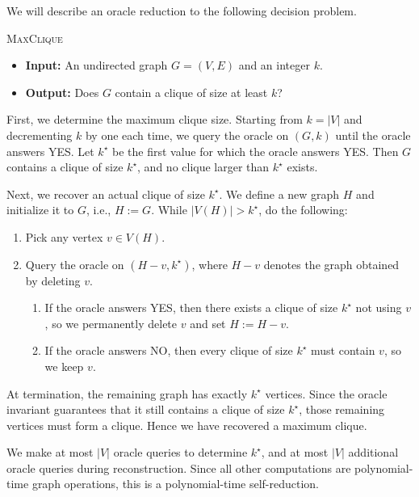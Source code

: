 \documentclass[12pt]{article}
\begin{document}
\begin{solution}
\bbni

    \item
    We will describe an oracle reduction to the following decision problem.

    \begin{tcolorbox}
        \textsc{MaxClique}
        \begin{itemize}
            \item \textbf{Input:} An undirected graph $G=(V,E)$ and an integer $k$.
            \item \textbf{Output:} Does $G$ contain a clique of size at least $k$?
        \end{itemize}
    \end{tcolorbox}

    First, we determine the maximum clique size. Starting from $k = |V|$ and decrementing $k$ by one each time, we query the oracle on $(G,k)$ until the oracle answers YES. Let $k^\star$ be the first value for which the oracle answers YES. Then $G$ contains a clique of size $k^\star$, and no clique larger than $k^\star$ exists.

    Next, we recover an actual clique of size $k^\star$. We define a new graph $H$ and initialize it to $G$, i.e., $H := G$. While $|V(H)| > k^\star$, do the following:

    \begin{enumerate}
        \item Pick any vertex $v \in V(H)$.
        \item Query the oracle on $(H-v, k^\star)$, where $H-v$ denotes the graph obtained by deleting $v$.
        \begin{enumerate}
            \item If the oracle answers YES, then there exists a clique of size $k^\star$ not using $v$, so we permanently delete $v$ and set $H := H-v$.
            \item If the oracle answers NO, then every clique of size $k^\star$ must contain $v$, so we keep $v$.
        \end{enumerate}
    \end{enumerate}

    At termination, the remaining graph has exactly $k^\star$ vertices. Since the oracle invariant guarantees that it still contains a clique of size $k^\star$, those remaining vertices must form a clique. Hence we have recovered a maximum clique.

    We make at most $|V|$ oracle queries to determine $k^\star$, and at most $|V|$ additional oracle queries during reconstruction. Since all other computations are polynomial-time graph operations, this is a polynomial-time self-reduction.
\end{solution}
\end{document}
